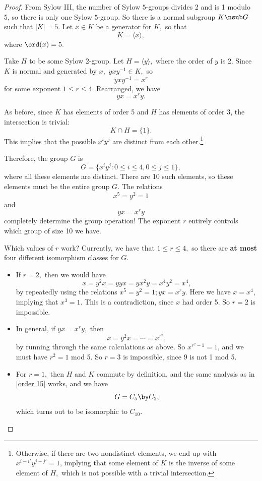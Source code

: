 \begin{proof}

From Sylow III, the number of Sylow $5$-groups divides 2 and is 1 modulo 5, so there is only one Sylow $5$-group. So there is a normal subgroup $K \nsub G$ such that $|K| = 5.$ Let $x \in K$ be a generator for $K,$ so that \[K = \langle x \rangle,\] where $\ord(x) = 5.$ 

Take $H$ to be some Sylow 2-group. Let $H = \langle y \rangle,$ where the order of $y$ is 2. Since $K$ is normal and generated by $x,$ $yxy^{-1}  \in K,$ so \[yxy^{-1} = x^r\]
for some exponent $1 \leq r \leq 4.$ Rearranged, we have \[yx = x^r y.\] 

As before, since $K$ has elements of order 5 and $H$ has elements of order 3, the intersection is trivial: \[K \cap H = \{1\}.\] This implies that the possible $x^iy^j$ are distinct from each other.\footnote{Otherwise, if there are two nondistinct elements, we end up with $x^{i-i'}y^{j-j'} = 1$, implying that some element of $K$ is the inverse of some element of $H,$ which is not possible with a trivial intersection.}

Therefore, the group $G$ is 
\[
G = \{x^i y^j: 0 \leq i \leq 4, 0 \leq j \leq 1\},
\]
where all these elements are distinct. There are 10 such elements, so these elements must be the entire group $G.$ The relations \[x^5 = y^2 = 1\] and \[yx = x^r y\] completely determine the group operation! The exponent $r$ entirely controls which group of size 10 we have. 

Which values of $r$ work? Currently, we have that $1 \leq r \leq 4,$ so there are \textbf{at most} four different isomorphism classes for $G.$ 

\begin{itemize}
    \item If $r = 2,$ then we would have \[x = y^2x = yyx = yx^2y = x^4y^2 = x^4,\] by repeatedly using the relations $x^5 = y^2 = 1; yx = x^r y$. Here we have $x = x^4$, implying that $x^3 = 1.$ This is a contradiction, since $x$ had order 5. So $r = 2$ is impossible.
    
    \item In general, if $yx = x^r y,$ then \[x = y^2x = \cdots = x^{r^2},\] by running through the same calculations as above. So $x^{r^2-1} = 1$, and we must have $r^2 = 1$ mod 5. So $r = 3$ is impossible, since $9$ is not 1 mod 5. 
    
    \item For $r = 1,$ then $H$ and $K$ commute by definition, and the same analysis as in \ref{order 15} works, and we have \[G = C_5 \by C_2,\] which turns out to be isomorphic to $C_{10}.$ 
    

\end{itemize}
\end{proof}

